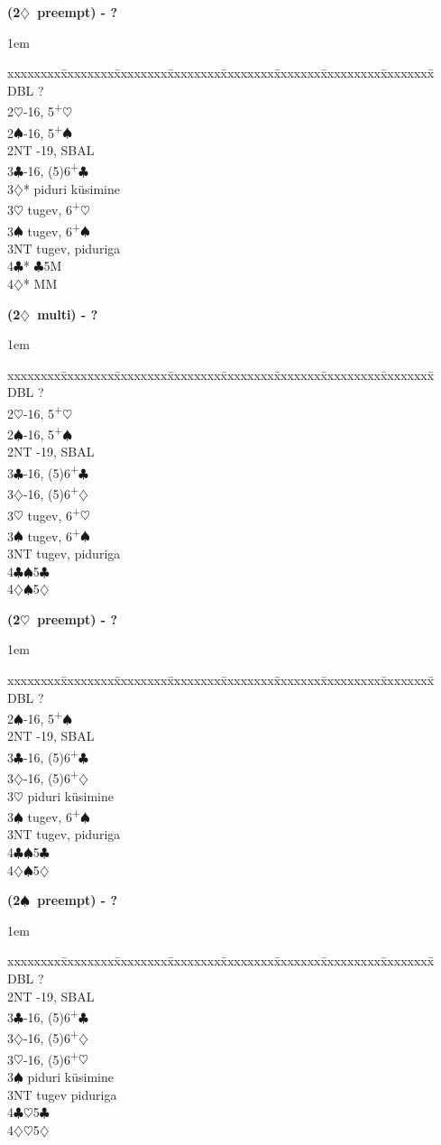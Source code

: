 \documentclass[10pt]{article}
\renewcommand{\c}{$\clubsuit$}
\renewcommand{\d}{$\diamondsuit$}
\newcommand{\h}{$\heartsuit$}
\newcommand{\s}{$\spadesuit$}
\newcommand{\p}{\textsuperscript{+}}
\newcommand{\x}{DBL}
\newenvironment{bidtable}[1][]
{\textbf{#1}
  \begin{adjustwidth}{1em}{}
    \addvspace{2pt}
    \begin{tabbing}
      xxxxxxxx\=xxxxxxxx\=xxxxxxxx\=xxxxxxxx\=xxxxxxxx\=xxxxxxx\=xxxxxxxxx\=xxxxxxxx\=\kill}
{\end{tabbing}\end{adjustwidth}\bigskip}%
\begin{document}
\begin{bidtable}[(2\d\ preempt) - ?]
\x   \> ?               \\
2\h  {}-16, 5\p\h    \\
2\s  {}-16, 5\p\s    \\
2NT  -19, SBAL     \\
3\c  {}-16, (5)6\p\c \\
3\d* \> piduri küsimine \\
3\h  \> tugev, 6\p\h    \\
3\s  \> tugev, 6\p\s    \\
3NT  \> tugev, piduriga \\
4\c* {}\c 5M          \\
4\d* {} MM
\end{bidtable}

\begin{bidtable}[(2\d\ multi) - ?]
\x  \> ?               \\
2\h {}-16, 5\p\h    \\
2\s {}-16, 5\p\s    \\
2NT -19, SBAL     \\
3\c {}-16, (5)6\p\c \\
3\d {}-16, (5)6\p\d \\
3\h \> tugev, 6\p\h    \\
3\s \> tugev, 6\p\s    \\
3NT \> tugev, piduriga \\
4\c {}\s 5\c         \\
4\d {}\s 5\d
\end{bidtable}

\begin{bidtable}[(2\h\ preempt) - ?]
\x  \> ?               \\
2\s {}-16, 5\p\s    \\
2NT -19, SBAL     \\
3\c {}-16, (5)6\p\c \\
3\d {}-16, (5)6\p\d \\
3\h \> piduri küsimine \\
3\s \> tugev, 6\p\s    \\
3NT \> tugev, piduriga \\
4\c {}\s 5\c         \\
4\d {}\s 5\d
\end{bidtable}


\begin{bidtable}[(2\s\ preempt) - ?]
\x  \> ?               \\
2NT -19, SBAL     \\
3\c {}-16, (5)6\p\c \\
3\d {}-16, (5)6\p\d \\
3\h {}-16, (5)6\p\h \\
3\s \> piduri küsimine \\
3NT \> tugev piduriga  \\
4\c {}\h 5\c         \\
4\d {}\h 5\d
\end{bidtable}
\end{document}
